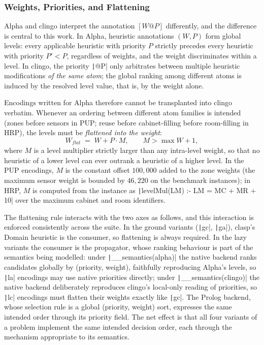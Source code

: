 \subsubsection{Weights, Priorities, and Flattening}
\label{sec:flattening}

Alpha and clingo interpret the annotation $[W@P]$ differently, and the difference is central to this work. In Alpha, heuristic annotations $(W,P)$ form global levels: every applicable heuristic with priority $P$ strictly precedes every heuristic with priority $P' < P$, regardless of weights, and the weight discriminates within a level. In clingo, the priority \texttt|@P| only arbitrates between multiple heuristic modifications \emph{of the same atom}; the global ranking among different atoms is induced by the resolved level value, that is, by the weight alone.

Encodings written for Alpha therefore cannot be transplanted into clingo verbatim. Whenever an ordering between different atom families is intended (zones before sensors in PUP; reuse before cabinet-filling before room-filling in HRP), the levels must be \emph{flattened into the weight}:
\[
W_{\mathit{flat}} \;=\; W + P \cdot M,
\qquad M > \max W + 1,
\]
where $M$ is a level multiplier strictly larger than any intra-level weight, so that no heuristic of a lower level can ever outrank a heuristic of a higher level. In the PUP encodings, $M$ is the constant offset $100{,}000$ added to the zone weights (the maximum sensor weight is bounded by $46{,}220$ on the benchmark instances); in HRP, $M$ is computed from the instance as \texttt|levelMul(LM) :- LM = MC + MR + 10| over the maximum cabinet and room identifiers.

The flattening rule interacts with the two axes as follows, and this interaction is enforced consistently across the suite. In the ground variants (\texttt|gc|, \texttt|ga|), clasp's Domain heuristic is the consumer, so flattening is always required. In the lazy variants the consumer is the propagator, whose ranking behaviour is part of the semantics being modelled: under \texttt|__semantics(alpha)| the native backend ranks candidates globally by (priority, weight), faithfully reproducing Alpha's levels, so \texttt|la| encodings may use native priorities directly; under \texttt|__semantics(clingo)| the native backend deliberately reproduces clingo's local-only reading of priorities, so \texttt|lc| encodings must flatten their weights exactly like \texttt|gc|. The Prolog backend, whose selection rule is a global (priority, weight) sort, expresses the same intended order through its priority field. The net effect is that all four variants of a problem implement the same intended decision order, each through the mechanism appropriate to its semantics.

